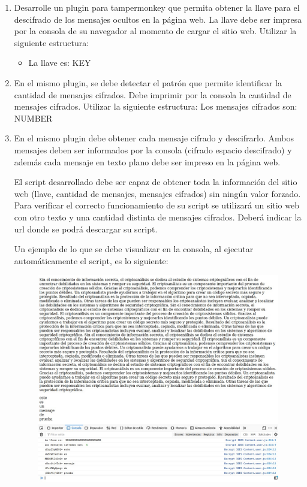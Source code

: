 \documentclass[letter,12pt]{article}
\begin{document}
\begin{enumerate}
    \item Desarrolle un plugin para tampermonkey que permita obtener la llave
      para el descifrado de los mensajes ocultos en la página web. La llave debe
      ser impresa por la consola de su navegador al momento de cargar el sitio
      web. Utilizar la siguiente estructura:
    \begin{itemize}
        \item   La llave es: KEY
    \end{itemize}
    \item En el mismo plugin, se debe detectar el patrón que permite identificar
      la cantidad de mensajes cifrados. Debe imprimir por la consola la cantidad
      de mensajes cifrados. Utilizar la siguiente estructura: Los mensajes
      cifrados son: NUMBER
    \item En el mismo plugin debe obtener cada mensaje cifrado y descifrarlo.
      Ambos mensajes deben ser informados por la consola (cifrado espacio
      descifrado) y además cada mensaje en texto plano debe ser impreso en la
      página web. \par El script desarrollado debe ser capaz de obtener toda la
      información del sitio web (llave, cantidad de mensajes, mensajes cifrados)
      sin ningún valor forzado. Para verificar el correcto funcionamiento de su
      script se utilizará un sitio web con otro texto y una cantidad distinta de
      mensajes cifrados. Deberá indicar la url donde se podrá descargar su
      script.\par Un ejemplo de lo que se debe visualizar en la consola, al
      ejecutar automáticamente el script, es lo siguiente:
    \begin{figure}[H]
        \centering \includegraphics[width=16cm]{Desarrollo/ejemplo.png}
        \label{fig:ejemplo}
    \end{figure}
\end{enumerate}
\end{document}
